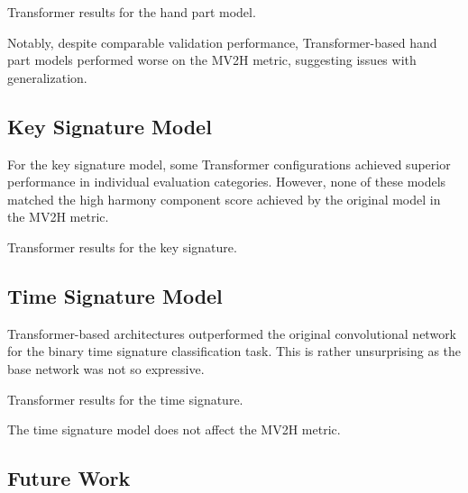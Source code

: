 \begin{table}[ht!]
\centering

\caption[Transformer results for the hand part model.]{Transformer results for the hand part model.}
\label{hand_part_transformer}
\end{table}

Notably, despite comparable validation performance, Transformer-based hand part models performed worse on the MV2H metric, suggesting issues with generalization.

\subsection{Key Signature Model}

For the key signature model, some Transformer configurations achieved superior performance in individual evaluation categories. However, none of these models matched the high harmony component score achieved by the original model in the MV2H metric.

\begin{table}[ht!]
\centering

\caption[Transformer results for the key signature.]{Transformer results for the key signature.}
\label{key_signature_transformer}
\end{table}

\subsection{Time Signature Model}

Transformer-based architectures outperformed the original convolutional network for the binary time signature classification task. This is rather unsurprising as the base network was not so expressive.

\begin{table}[ht!]
\centering

\caption[Transformer results for the time signature.]{Transformer results for the time signature.}
\label{time_signature_transformer}
\end{table}

The time signature model does not affect the MV2H metric.

\subsection{Future Work}

